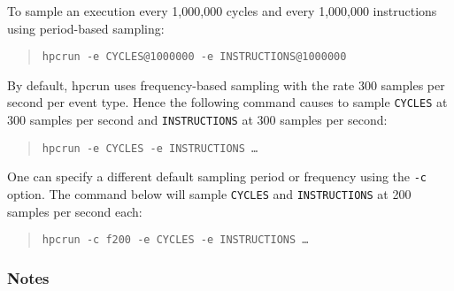 To sample an execution every 1,000,000 cycles and every 1,000,000 instructions using period-based sampling:

\begin{quote}
\begin{verbatim}
hpcrun -e CYCLES@1000000 -e INSTRUCTIONS@1000000
\end{verbatim}
\end{quote}

By default, hpcrun uses frequency-based sampling with the rate
300 samples per second per event type. Hence the following command causes \HPCToolkit{} to
sample \verb|CYCLES| at 300 samples per second and \verb|INSTRUCTIONS| at 300 samples per second:

\begin{quote}
\begin{verbatim}
hpcrun -e CYCLES -e INSTRUCTIONS …
\end{verbatim}
\end{quote}

One can specify a different default sampling period or frequency using the \verb|-c| option. 
The command below will sample  \verb|CYCLES| and \verb|INSTRUCTIONS| at 200 samples per second each:

\begin{quote}
\begin{verbatim}
hpcrun -c f200 -e CYCLES -e INSTRUCTIONS …
\end{verbatim}
\end{quote}



\subsubsection{Notes}

